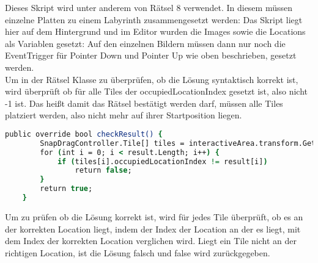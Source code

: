 {Dieses Skript wird unter anderem von Rätsel 8 verwendet. In diesem müssen einzelne Platten zu einem Labyrinth zusammengesetzt werden:
Das Skript liegt hier auf dem Hintergrund und im Editor wurden die Images sowie die Locations als Variablen gesetzt:
Auf den einzelnen Bildern müssen dann nur noch die EventTrigger für Pointer Down und Pointer Up wie oben beschrieben, gesetzt werden.\\
Um in der Rätsel Klasse zu überprüfen, ob die Lösung syntaktisch korrekt ist, wird überprüft ob für alle Tiles der occupiedLocationIndex gesetzt ist, also nicht -1 ist. Das heißt damit das Rätsel bestätigt werden darf, müssen alle Tiles platziert werden, also nicht mehr auf ihrer Startposition liegen.\\
\begin{lstlisting}[language=csh, caption={Überprüfen der Lösung eines SnapDragControllers}]
public override bool checkResult() {
        SnapDragController.Tile[] tiles = interactiveArea.transform.GetComponent<SnapDragController>().tiles;
        for (int i = 0; i < result.Length; i++) {
            if (tiles[i].occupiedLocationIndex != result[i])
                return false;
        }
        return true;
    }
\end{lstlisting}
Um zu prüfen ob die Lösung korrekt ist, wird für jedes Tile überprüft, ob es an der korrekten Location liegt, indem der Index der Location an der es liegt, mit dem Index der korrekten Location verglichen wird. Liegt ein Tile nicht an der richtigen Location, ist die Lösung falsch und false wird zurückgegeben.

}
